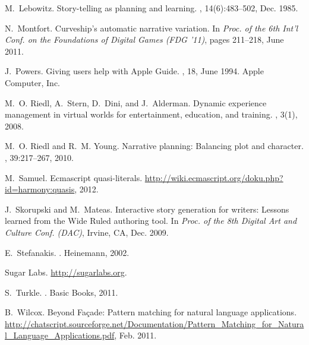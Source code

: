 \documentclass{sig-alternate}
\begin{document}
\begin{thebibliography}{10}
M.~Lebowitz.
\newblock Story-telling as planning and learning.
, 14(6):483--502, Dec. 1985.

N.~Montfort.
\newblock Curveship's automatic narrative variation.
\newblock In {\em Proc. of the 6th Int'l Conf. on the Foundations of Digital
  Games (FDG '11)}, pages 211--218, June 2011.

J.~Powers.
\newblock Giving users help with {A}pple {G}uide.
, 18, June 1994.
\newblock Apple Computer, Inc.

M.~O. Riedl, A.~Stern, D.~Dini, and J.~Alderman.
\newblock Dynamic experience management in virtual worlds for entertainment,
  education, and training.
, 3(1), 2008.

M.~O. Riedl and R.~M. Young.
\newblock Narrative planning: Balancing plot and character.
, 39:217--267, 2010.

M.~Samuel.
\newblock Ecmascript quasi-literals.
\newblock \url{http://wiki.ecmascript.org/doku.php?id=harmony:quasis}, 2012.

J.~Skorupski and M.~Mateas.
\newblock Interactive story generation for writers: Lessons learned from the
  {W}ide {R}uled authoring tool.
\newblock In {\em Proc. of the 8th Digital Art and Culture Conf. (DAC)},
  Irvine, CA, Dec. 2009.

E.~Stefanakis.
.
\newblock Heinemann, 2002.

{Sugar Labs}.
\newblock \url{http://sugarlabs.org}.

S.~Turkle.
.
\newblock Basic Books, 2011.

B.~Wilcox.
\newblock Beyond {F}a\c{c}ade: Pattern matching for natural language
  applications.
\newblock
  \url{http://chatscript.sourceforge.net/Documentation/Pattern_Matching_for_Natural_Language_Applications.pdf},
  Feb. 2011.

\end{thebibliography}

%
\end{document}
